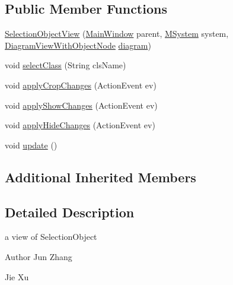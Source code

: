 \subsection*{Public Member Functions}
\begin{DoxyCompactItemize}
\item 
\hyperlink{classorg_1_1tzi_1_1use_1_1gui_1_1views_1_1selection_1_1objectselection_1_1_selection_object_view_a7c6b0e527a11d82277c5ffd1e40aa97c}{Selection\-Object\-View} (\hyperlink{classorg_1_1tzi_1_1use_1_1gui_1_1main_1_1_main_window}{Main\-Window} parent, \hyperlink{classorg_1_1tzi_1_1use_1_1uml_1_1sys_1_1_m_system}{M\-System} system, \hyperlink{classorg_1_1tzi_1_1use_1_1gui_1_1views_1_1diagrams_1_1_diagram_view_with_object_node}{Diagram\-View\-With\-Object\-Node} \hyperlink{classorg_1_1tzi_1_1use_1_1gui_1_1views_1_1selection_1_1_object_selection_view_a3aab89dd6fcf330a0095e90ac047f196}{diagram})
\item 
void \hyperlink{classorg_1_1tzi_1_1use_1_1gui_1_1views_1_1selection_1_1objectselection_1_1_selection_object_view_a6b967c1617a1256ef19fff6922332bc3}{select\-Class} (String cls\-Name)
\item 
void \hyperlink{classorg_1_1tzi_1_1use_1_1gui_1_1views_1_1selection_1_1objectselection_1_1_selection_object_view_a1d222725f87bf92867b64d96b0fc7d3a}{apply\-Crop\-Changes} (Action\-Event ev)
\item 
void \hyperlink{classorg_1_1tzi_1_1use_1_1gui_1_1views_1_1selection_1_1objectselection_1_1_selection_object_view_aa299b50a55eba09d3de523d549555b50}{apply\-Show\-Changes} (Action\-Event ev)
\item 
void \hyperlink{classorg_1_1tzi_1_1use_1_1gui_1_1views_1_1selection_1_1objectselection_1_1_selection_object_view_a6152c9102e8d3f804d31a098f6fd353d}{apply\-Hide\-Changes} (Action\-Event ev)
\item 
void \hyperlink{classorg_1_1tzi_1_1use_1_1gui_1_1views_1_1selection_1_1objectselection_1_1_selection_object_view_a2a68e757f642e4398ca4fea73cee8e54}{update} ()
\end{DoxyCompactItemize}
\subsection*{Additional Inherited Members}


\subsection{Detailed Description}
a view of Selection\-Object \begin{DoxyAuthor}{Author}
Jun Zhang 

Jie Xu 
\end{DoxyAuthor}


